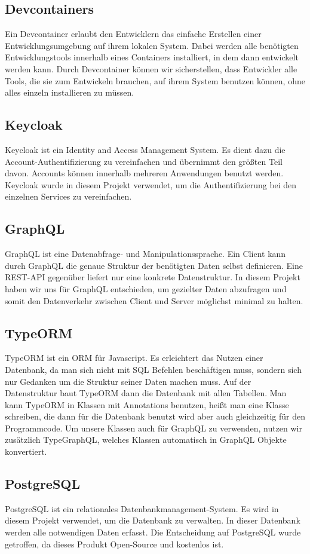 \subsection{Devcontainers}
    Ein Devcontainer erlaubt den Entwicklern das einfache Erstellen einer Entwicklungsumgebung auf ihrem lokalen System.
    Dabei werden alle benötigten Entwicklungstools innerhalb eines Containers installiert, in dem dann entwickelt werden kann.
    Durch Devcontainer können wir sicherstellen, dass Entwickler alle Tools, die sie zum Entwickeln brauchen, auf ihrem System benutzen können, ohne alles einzeln installieren zu müssen.
\subsection{Keycloak}
    Keycloak ist ein Identity and Access Management System. Es dient dazu die Account-Authentifizierung zu vereinfachen und übernimmt den größten Teil davon.
    Accounts können innerhalb mehreren Anwendungen benutzt werden. Keycloak wurde in diesem Projekt verwendet, um die Authentifizierung bei den einzelnen Services zu vereinfachen.
\subsection{GraphQL}
    GraphQL ist eine Datenabfrage- und Manipulationssprache. Ein Client kann durch GraphQL die genaue Struktur der benötigten Daten selbst definieren.
    Eine REST-API gegenüber liefert nur eine konkrete Datenstruktur.
    In diesem Projekt haben wir uns für GraphQL entschieden, um gezielter Daten abzufragen und somit den Datenverkehr zwischen Client und Server möglichst minimal zu halten.
\subsection{TypeORM}
    TypeORM ist ein \ac{ORM} für Javascript. Es erleichtert das Nutzen einer Datenbank, da man sich nicht mit \ac{SQL} Befehlen beschäftigen muss, sondern sich nur Gedanken um die Struktur seiner Daten machen muss.
    Auf der Datenstruktur baut TypeORM dann die Datenbank mit allen Tabellen. Man kann TypeORM in Klassen mit Annotations benutzen, heißt man eine Klasse schreiben, die dann für die Datenbank benutzt wird
    aber auch gleichzeitig für den Programmcode. Um unsere Klassen auch für GraphQL zu verwenden, nutzen wir zusätzlich TypeGraphQL, welches Klassen automatisch in GraphQL Objekte konvertiert.
\subsection{PostgreSQL}
    PostgreSQL ist ein relationales Datenbankmanagement-System. Es wird in diesem Projekt verwendet, um die Datenbank zu verwalten. In dieser Datenbank werden alle notwendigen Daten erfasst.
    Die Entscheidung auf PostgreSQL wurde getroffen, da dieses Produkt Open-Source und kostenlos ist.    

